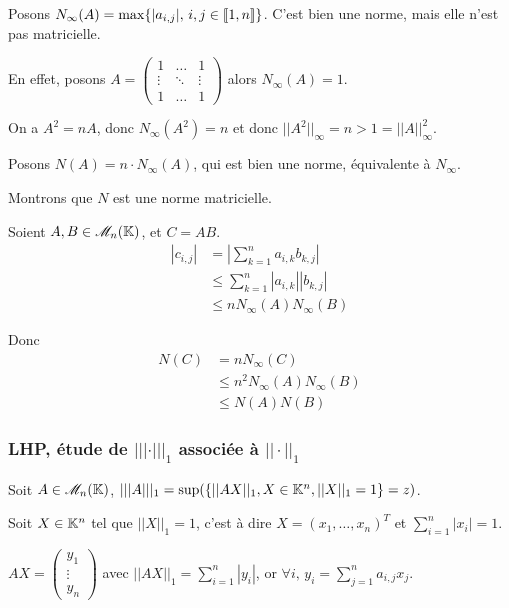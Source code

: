 \begin{exemple}
    Posons $N_\infty(A) = \max\{ |a_{i, j}|, \, i, j \in [\![1, n]\!]\}$. 
    C'est bien une norme, mais elle n'est pas matricielle. 

    En effet, posons 
    $A = \begin{pmatrix}
        1 & \dots & 1 \\
        \vdots & \ddots & \vdots \\
        1 & \dots & 1
    \end{pmatrix}$ alors $N_\infty(A) = 1$.

    On a $A^2 = nA$, donc $N_\infty(A^2) = n$ et donc $||A^2||_\infty = n > 1 = ||A||_\infty^2$. 

    \lvspace Posons $N(A) = n \cdot N_\infty(A)$, qui est bien une norme, équivalente à $N_\infty$.

    Montrons que $N$ est une norme matricielle.

    Soient $A, B \in \mathscr M_n(\mathbb{K})$, et $C = AB$. 
    \begin{align*}
        |c_{i, j}| & = \left| \sum_{k=1}^n a_{i, k} b_{k, j} \right| \\
        & \leqslant \sum_{k=1}^n |a_{i, k}| |b_{k, j}| \\
        & \leqslant n N_\infty(A) N_\infty(B)
    \end{align*}

    Donc 
    \begin{align*}
        N(C) & = n N_\infty(C) \\
        & \leqslant n^2 N_\infty(A) N_\infty(B) \\
        &  \leqslant N(A) N(B)
    \end{align*}


\end{exemple}


\subsubsection{LHP, étude de $||| \cdot |||_1$ associée à $|| \cdot ||_1$}


Soit $A \in \mathscr M_n(\mathbb{K})$, $|||A|||_1 = \sup (\{ ||AX||_1, X \in \mathbb{K}^n, ||X||_1 = 1 \} = z) $.

Soit $X \in \mathbb{K}^n$ tel que $||X||_1 = 1$, c'est à dire $X = (x_1, \ldots, x_n)^T$ et $\sum_{i=1}^n |x_i| = 1$.

$AX = \begin{pmatrix}
    y_1 \\
    \vdots \\
    y_n
\end{pmatrix}$  avec $||AX||_1 = \sum_{i=1}^n |y_i|$, 
or $\displaystyle \forall i, \, y_i = \sum_{j=1}^n a_{i, j} x_j$. 

